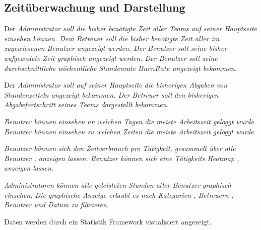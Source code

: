 \subsection{Zeitüberwachung und Darstellung}
    \begin{requirements}
        \begin{requirements}
             Der \em Administrator \em soll die bisher benötigte Zeit aller \em Teams \em auf seiner \em Hauptseite \em einsehen können.
             Dem \em Betreuer \em soll die bisher benötigte Zeit aller im zugewiesenen \em Benutzer \em angezeigt werden.
             Der \em Benutzer \em soll seine bisher aufgewedete Zeit graphisch angezeigt werden.
             Der \em Benutzer \em soll seine durchschnittliche wöchentliche Stundenrate \(Burn Rate\) angezeigt bekommen.
        \end{requirements}

        \begin{requirements}
             Der \em Administrator \em soll auf seiner \em Hauptseite \em die bisherigen \em Abgaben \em von \em Stundenzetteln \em angezeigt bekommen.
             Der \em Betreuer \em soll den bisherigen Abgabefortschritt seines \em Teams \em dargestellt bekommen.
        \end{requirements}

        \begin{requirements}
             \em Benutzer \em können einsehen an welchen Tagen die meiste Arbeitszeit geloggt wurde.
             \em Benutzer \em können einsehen zu welchen Zeiten die meiste Arbeitszeit geloggt wurde.
        \end{requirements}

        \begin{requirements}
             \em Benutzer \em können sich den Zeitverbrauch pro Tätigkeit, gesammelt über alle \em Benutzer \em, anzeigen lassen.
             \em Benutzer \em können sich eine Tätigkeits \em Heatmap \em, anzeigen lassen.
        \end{requirements}
        
        \begin{requirements}
              \em Administratoren \em können alle geleisteten Stunden aller \em Benutzer \em graphisch einsehen.
              Die graphische Anzeige erlaubt es nach \em Kategorien \em, \em Betreuern \em, \em Benutzer \em und Datum zu filtrieren.
        \end{requirements}

        Daten werden durch ein Statistik Framework visualisiert angezeigt.
    \end{requirements}

